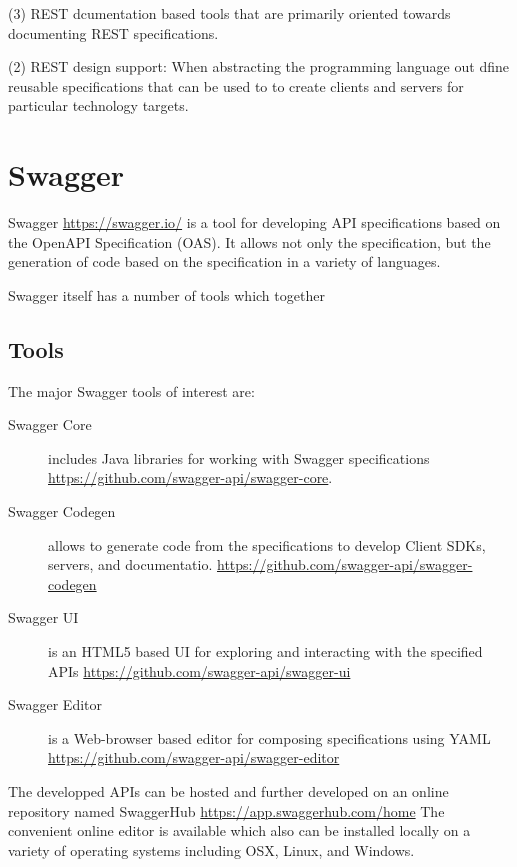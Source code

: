 (3) REST dcumentation based tools that are primarily oriented towards
documenting REST specifications.

(2) REST design support: When abstracting the programming language out
dfine reusable specifications that can be used to to create clients
and servers for particular technology targets.

\section{Swagger}

Swagger \url{https://swagger.io/} is a tool for developing API
specifications based on the OpenAPI Specification (OAS). It allows not
only the specification, but the generation of code based on the
specification in a variety of languages.

Swagger itself has a number of tools which together 


\subsection{Tools}

The major Swagger tools of interest are:

\begin{description}

\item[Swagger Core] includes Java libraries for working with Swagger
 specifications \url{https://github.com/swagger-api/swagger-core}.

\item[Swagger Codegen] allows to generate code from the specifications
 to develop Client SDKs, servers, and documentatio. \url{https://github.com/swagger-api/swagger-codegen}

\item[Swagger UI] is an HTML5 based UI for exploring and interacting
 with the specified APIs \url{https://github.com/swagger-api/swagger-ui}

\item[Swagger Editor] is a Web-browser based editor for composing 
 specifications using YAML \url{https://github.com/swagger-api/swagger-editor}

\end{description}

The developped APIs can be hosted and further developed on an
online repository named SwaggerHub \url{https://app.swaggerhub.com/home}
The convenient online editor is available which also can be installed
locally on a variety of operating systems including OSX, Linux, and
Windows. 



